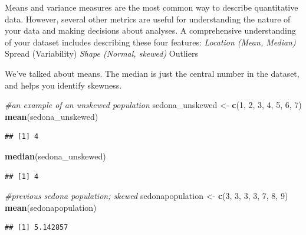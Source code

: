 \documentclass[
]{book}
\newenvironment{Shaded}{\begin{snugshade}}{\end{snugshade}}
\newcommand{\CommentTok}[1]{\textcolor[rgb]{0.56,0.35,0.01}{\textit{#1}}}
\newcommand{\DecValTok}[1]{\textcolor[rgb]{0.00,0.00,0.81}{#1}}
\newcommand{\FunctionTok}[1]{\textcolor[rgb]{0.13,0.29,0.53}{\textbf{#1}}}
\newcommand{\NormalTok}[1]{#1}
\newcommand{\OtherTok}[1]{\textcolor[rgb]{0.56,0.35,0.01}{#1}}
\begin{document}
Means and variance measures are the most common way to describe quantitative data. However, several other metrics are useful for understanding the nature of your data and making decisions about analyses. A comprehensive understanding of your dataset includes describing these four features:
\emph{Location (Mean, Median)
}Spread (Variability)
\emph{Shape (Normal, skewed)
}Outliers

We've talked about means. The median is just the central number in the dataset, and helps you identify skewness.

\begin{Shaded}
\begin{Highlighting}[]
\CommentTok{\#an example of an unskewed population}
\NormalTok{sedona\_unskewed }\OtherTok{\textless{}{-}} \FunctionTok{c}\NormalTok{(}\DecValTok{1}\NormalTok{, }\DecValTok{2}\NormalTok{, }\DecValTok{3}\NormalTok{, }\DecValTok{4}\NormalTok{, }\DecValTok{5}\NormalTok{, }\DecValTok{6}\NormalTok{, }\DecValTok{7}\NormalTok{)}
\FunctionTok{mean}\NormalTok{(sedona\_unskewed)}
\end{Highlighting}
\end{Shaded}

\begin{verbatim}
## [1] 4
\end{verbatim}

\begin{Shaded}
\begin{Highlighting}[]
\FunctionTok{median}\NormalTok{(sedona\_unskewed)}
\end{Highlighting}
\end{Shaded}

\begin{verbatim}
## [1] 4
\end{verbatim}

\begin{Shaded}
\begin{Highlighting}[]
\CommentTok{\#previous sedona population; skewed}
\NormalTok{sedonapopulation }\OtherTok{\textless{}{-}} \FunctionTok{c}\NormalTok{(}\DecValTok{3}\NormalTok{, }\DecValTok{3}\NormalTok{, }\DecValTok{3}\NormalTok{, }\DecValTok{3}\NormalTok{, }\DecValTok{7}\NormalTok{, }\DecValTok{8}\NormalTok{, }\DecValTok{9}\NormalTok{)}
\FunctionTok{mean}\NormalTok{(sedonapopulation)}
\end{Highlighting}
\end{Shaded}

\begin{verbatim}
## [1] 5.142857
\end{verbatim}
\end{document}
